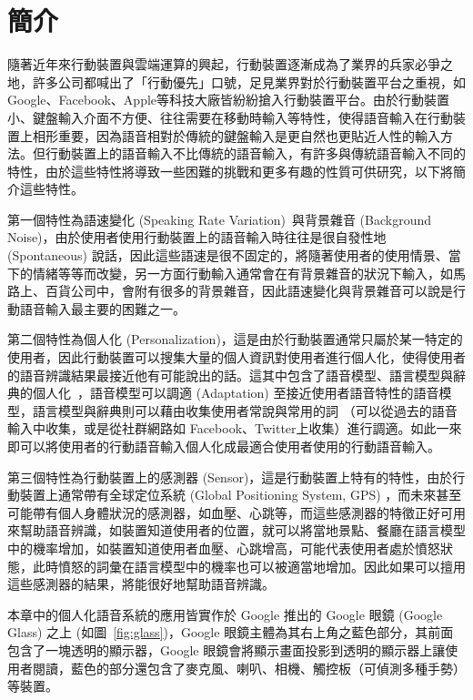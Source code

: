 \section{簡介}
隨著近年來行動裝置與雲端運算的興起，行動裝置逐漸成為了業界的兵家必爭之地，許多公司都喊出了「行動優先」口號，足見業界對於行動裝置平台之重視，如Google、Facebook、Apple等科技大廠皆紛紛搶入行動裝置平台。由於行動裝置小、鍵盤輸入介面不方便、往往需要在移動時輸入等特性，使得語音輸入在行動裝置上相形重要，因為語音相對於傳統的鍵盤輸入是更自然也更貼近人性的輸入方法。但行動裝置上的語音輸入不比傳統的語音輸入，有許多與傳統語音輸入不同的特性，由於這些特性將導致一些困難的挑戰和更多有趣的性質可供研究，以下將簡介這些特性。

第一個特性為語速變化 (Speaking Rate Variation)~\cite{DBLP:conf/interspeech/YehLL13}與背景雜音 (Background Noise)，由於使用者使用行動裝置上的語音輸入時往往是很自發性地 (Spontaneous) 說話，因此這些語速是很不固定的，將隨著使用者的使用情景、當下的情緒等等而改變，另一方面行動輸入通常會在有背景雜音的狀況下輸入，如馬路上、百貨公司中，會附有很多的背景雜音，因此語速變化與背景雜音可以說是行動語音輸入最主要的困難之一。

第二個特性為個人化 (Personalization)，這是由於行動裝置通常只屬於某一特定的使用者，因此行動裝置可以搜集大量的個人資訊對使用者進行個人化，使得使用者的語音辨識結果最接近他有可能說出的話。這其中包含了語音模型、語言模型與辭典的個人化~\cite{DBLP:conf/interspeech/WenHLTL13, wen2012personalized, bellegarda2004statistical}，語音模型可以調適 (Adaptation) 至接近使用者語音特性的語音模型，語言模型與辭典則可以藉由收集使用者常說與常用的詞
（可以從過去的語音輸入中收集，或是從社群網路如 Facebook、Twitter上收集）進行調適。如此一來即可以將使用者的行動語音輸入個人化成最適合使用者使用的行動語音輸入。

第三個特性為行動裝置上的感測器 (Sensor)，這是行動裝置上特有的特性，由於行動裝置上通常帶有全球定位系統 (Global Positioning System, GPS)
，而未來甚至可能帶有個人身體狀況的感測器，如血壓、心跳等，而這些感測器的特徵正好可用來幫助語音辨識，如裝置知道使用者的位置，就可以將當地景點、餐廳在語言模型中的機率增加，如裝置知道使用者血壓、心跳增高，可能代表使用者處於憤怒狀態，此時憤怒的詞彙在語言模型中的機率也可以被適當地增加。因此如果可以擅用這些感測器的結果，將能很好地幫助語音辨識。

本章中的個人化語音系統的應用皆實作於 Google 推出的 Google 眼鏡 (Google Glass) 之上 (如圖~\ref{fig:glass})，Google 眼鏡主體為其右上角之藍色部分，其前面包含了一塊透明的顯示器，Google 眼鏡會將顯示畫面投影到透明的顯示器上讓使用者閱讀，藍色的部分還包含了麥克風、喇叭、相機、觸控板（可偵測多種手勢）等裝置。

